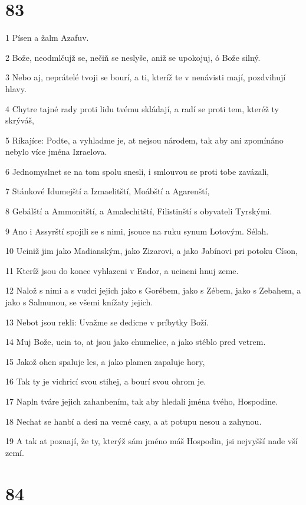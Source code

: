 \chapter{83}

\par 1 Písen a žalm Azafuv.
\par 2 Bože, neodmlčujž se, nečiň se neslyše, aniž se upokojuj, ó Bože silný.
\par 3 Nebo aj, neprátelé tvoji se bourí, a ti, kteríž te v nenávisti mají, pozdvihují hlavy.
\par 4 Chytre tajné rady proti lidu tvému skládají, a radí se proti tem, kteréž ty skrýváš,
\par 5 Ríkajíce: Podte, a vyhladme je, at nejsou národem, tak aby ani zpomínáno nebylo více jména Izraelova.
\par 6 Jednomyslnet se na tom spolu snesli, i smlouvou se proti tobe zavázali,
\par 7 Stánkové Idumejští a Izmaelitští, Moábští a Agarenští,
\par 8 Gebálští a Ammonitští, a Amalechitští, Filistinští s obyvateli Tyrskými.
\par 9 Ano i Assyrští spojili se s nimi, jsouce na ruku synum Lotovým. Sélah.
\par 10 Uciniž jim jako Madianským, jako Zizarovi, a jako Jabínovi pri potoku Císon,
\par 11 Kteríž jsou do konce vyhlazeni v Endor, a ucineni hnuj zeme.
\par 12 Nalož s nimi a s vudci jejich jako s Gorébem, jako s Zébem, jako s Zebahem, a jako s Salmunou, se všemi knížaty jejich.
\par 13 Nebot jsou rekli: Uvažme se dedicne v príbytky Boží.
\par 14 Muj Bože, ucin to, at jsou jako chumelice, a jako stéblo pred vetrem.
\par 15 Jakož ohen spaluje les, a jako plamen zapaluje hory,
\par 16 Tak ty je vichricí svou stihej, a bourí svou ohrom je.
\par 17 Napln tváre jejich zahanbením, tak aby hledali jména tvého, Hospodine.
\par 18 Nechat se hanbí a desí na vecné casy, a at potupu nesou a zahynou.
\par 19 A tak at poznají, že ty, kterýž sám jméno máš Hospodin, jsi nejvyšší nade vší zemí.

\chapter{84}

